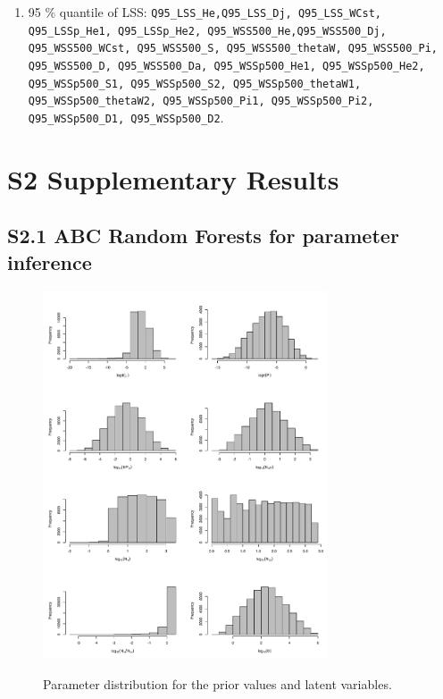\documentclass[12pt]{article}
\begin{document}
\begin{enumerate}
    \item 95 \% quantile of LSS: \texttt{Q95\_LSS\_He,Q95\_LSS\_Dj, Q95\_LSS\_WCst, Q95\_LSSp\_He1, Q95\_LSSp\_He2, Q95\_WSS500\_He,Q95\_WSS500\_Dj, Q95\_WSS500\_WCst, Q95\_WSS500\_S, Q95\_WSS500\_thetaW, Q95\_WSS500\_Pi, Q95\_WSS500\_D, Q95\_WSS500\_Da, Q95\_WSSp500\_He1, Q95\_WSSp500\_He2, Q95\_WSSp500\_S1, Q95\_WSSp500\_S2, Q95\_WSSp500\_thetaW1, Q95\_WSSp500\_thetaW2, Q95\_WSSp500\_Pi1, Q95\_WSSp500\_Pi2, Q95\_WSSp500\_D1, Q95\_WSSp500\_D2}.
\end{enumerate}

\newpage
\section*{S2 Supplementary Results}

\subsection*{S2.1 ABC Random Forests for parameter inference}
\begin{figure}[ht]
  \centering
  \includegraphics[width=0.75\textwidth]{Figures/parameters_histograms.pdf}
  \label{fig:figS2}
  \caption{Parameter distribution for the prior values and latent variables.}
\end{figure}
\end{document}
